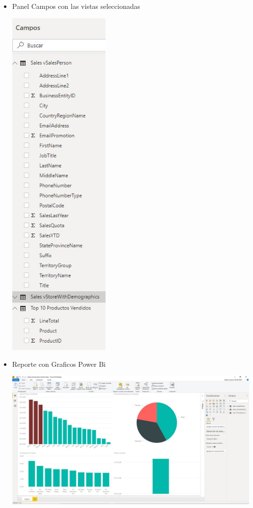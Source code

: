 \begin{itemize}
	\item Panel Campos con las vistas seleccionadas
	\begin{center}
	\includegraphics[width=5cm]{./Imagenes/Captura4-5} 
	\end{center}
\end{itemize} 

\begin{itemize}
	\item Reporte con Graficos Power Bi
	\begin{center}
	\includegraphics[width=13cm]{./Imagenes/Captura5} 
	\end{center}
\end{itemize} 

